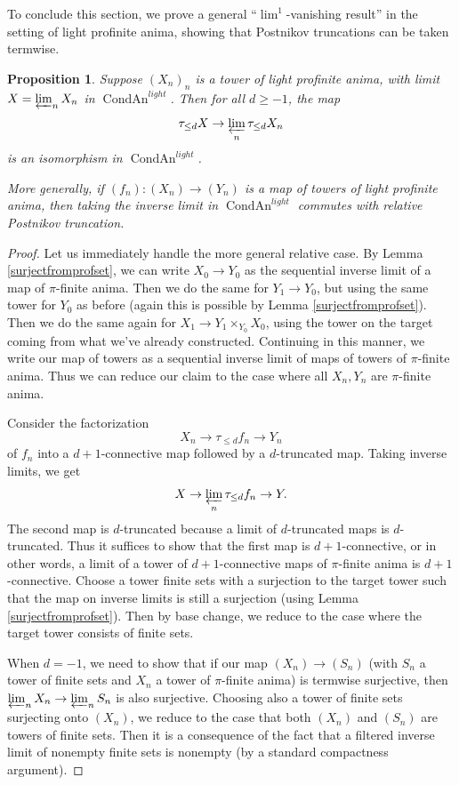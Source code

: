 \documentclass[12pt]{article}
\newtheorem{proposition}[theorem]{Proposition}
\newcommand{\on}{\operatorname}
\begin{document}
To conclude this section, we prove a general ``$\on{lim}^1$-vanishing result'' in the setting of light profinite anima, showing that Postnikov truncations can be taken termwise.

\begin{proposition}\label{truncateprof}
Suppose $(X_n)_n$ is a tower of light profinite anima, with limit $X=\varprojlim_n X_n$ in $\on{CondAn}^{light}$.  Then for all $d\geq -1$, the map
$$\tau_{\leq d} X \rightarrow \varprojlim_n \tau_{\leq d}X_n$$
is an isomorphism in $\on{CondAn}^{light}$.

More generally, if $(f_n):(X_n)\rightarrow (Y_n)$ is a map of towers of light profinite anima, then taking the inverse limit in $\on{CondAn}^{light}$ commutes with relative Postnikov truncation.
\end{proposition}
\begin{proof}
Let us immediately handle the more general relative case.  By Lemma \ref{surjectfromprofset}, we can write $X_0 \to Y_0$ as the sequential inverse limit of a map of $\pi$-finite anima.  Then we do the same for $Y_1 \to Y_0$, but using the same tower for $Y_0$ as before (again this is possible by Lemma \ref{surjectfromprofset}).  Then we do the same again for $X_1 \to Y_1\times_{Y_0}X_0$, using the tower on the target coming from what we've already constructed.  Continuing in this manner, we write our map of towers as a sequential inverse limit of maps of towers of $\pi$-finite anima. Thus we can reduce our claim to the case where all $X_n,Y_n$ are $\pi$-finite anima.


Consider the factorization
$$X_n\rightarrow \tau_{\leq d}f_n \rightarrow Y_n$$
of $f_n$ into a $d+1$-connective map followed by a $d$-truncated map. Taking inverse limits, we get
$$X\rightarrow \varprojlim_n \tau_{\leq d}f_n\rightarrow Y.$$
The second map is $d$-truncated because a limit of $d$-truncated maps is $d$-truncated.  Thus it suffices to show that the first map is $d+1$-connective, or in other words, a limit of a tower of $d+1$-connective maps of $\pi$-finite anima is $d+1$-connective.  Choose a tower finite sets with a surjection to the target tower such that the map on inverse limits is still a surjection (using Lemma \ref{surjectfromprofset}).  Then by base change, we reduce to the case where the target tower consists of finite sets.

When $d=-1$, we need to show that if our map $(X_n)\rightarrow (S_n)$ (with $S_n$ a tower of finite sets and $X_n$ a tower of $\pi$-finite anima) is termwise surjective, then $\varprojlim_n X_n\rightarrow\varprojlim_n S_n$ is also surjective.  Choosing also a tower of finite sets surjecting onto $(X_n)$, we reduce to the case that both $(X_n)$ and $(S_n)$ are towers of finite sets.  Then it is a consequence of the fact that a filtered inverse limit of nonempty finite sets is nonempty (by a standard compactness argument).


\end{proof}
\end{document}
